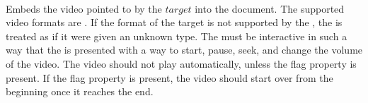  \\

Embeds the video pointed to by the \inline$target$ into the document. The supported video formats are . If the format of the target is not supported by the , the  is treated as if it were given an unknown type. The  must be interactive in such a way that the  is presented with a way to start, pause, seek, and change the volume of the video. The video should not play automatically, unless the  flag property is present. If the  flag property is present, the video should start over from the beginning once it reaches the end. \\

\begin{examples}
\end{examples}
